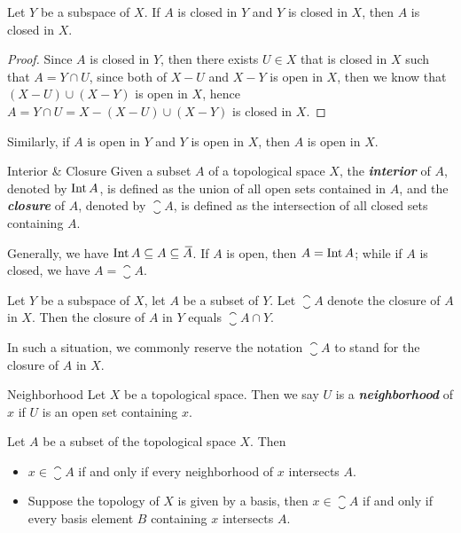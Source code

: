 \documentclass[12pt,a4paper]{article}
\begin{document}
    \begin{thm}
        Let $Y$ be a subspace of $X$. If $A$ is closed in $Y$ and $Y$ is closed in $X$, then $A$ is closed in $X$.
    \end{thm}
    \begin{proof}
        Since $A$ is closed in $Y$, then there exists $U\in X$ that is closed in $X$ such that $A=Y\cap U$, since both of $X-U$ and $X-Y$ is open in $X$, then we know that $(X-U)\cup(X-Y)$ is open in $X$, hence $A=Y\cap U=X-(X-U)\cup(X-Y)$ is closed in $X$.
    \end{proof}
    \begin{remark}
        Similarly, if $A$ is open in $Y$ and $Y$ is open in $X$, then $A$ is open in $X$.
    \end{remark}
    \hfill

    \begin{defi}{Interior \& Closure}
        Given a subset $A$ of a topological space $X$, the \textbf{\textit{interior}} of $A$, denoted by $\mathrm{Int\,} A$, is defined as the union of all open sets contained in $A$, and the \textit{\textbf{closure}} of $A$, denoted by $\closure{A}$, is defined as the intersection of all closed sets containing $A$.
    \end{defi}
    \begin{remark}
        Generally, we have $\mathrm{Int\,} A\subseteq A\subseteq{}\mkern3mu\overline{\mkern-3muA}$. If $A$ is open, then $A=\mathrm{Int\,} A$; while if $A$ is closed, we have $A=\closure{A}$.
    \end{remark}
    \hfill

    \begin{thm}
        Let $Y$ be a subspace of $X$, let $A$ be a subset of $Y$. Let $\closure{A}$ denote the closure of $A$ in $X$. Then the closure of $A$ in $Y$ equals $\closure{A}\cap Y$.
    \end{thm}
    \begin{remark}
        In such a situation, we commonly reserve the notation $\closure{A}$ to stand for the closure of $A$ in $X$.
    \end{remark}
    \hfill

    \begin{defi}{Neighborhood}
        Let $X$ be a topological space. Then we say $U$ is a \textbf{\textit{neighborhood}} of $x$ if $U$ is an open set containing $x$.
    \end{defi}
    \hfill

    \begin{thm}
        Let $A$ be a subset of the topological space $X$. Then
        \begin{itemize}
            \item $x\in\closure{A}$ if and only if every neighborhood of $x$ intersects $A$.
            \item Suppose the topology of $X$ is given by a basis, then $x\in\closure{A}$ if and only if every basis element $B$ containing $x$ intersects $A$.
        \end{itemize}
    \end{thm}
    \hfill
\end{document}
